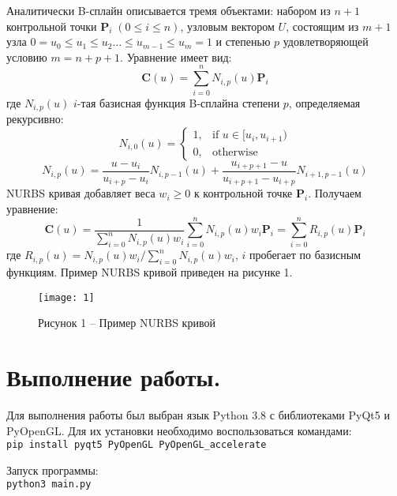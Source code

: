 Аналитически B-сплайн описывается тремя объектами: набором из $n+1$ контрольной точки
\(\mathbf{P}_{i}  \; (0\leq i \leq n)\), узловым вектором $U$, состоящим из $m + 1$ узла  \(0 = u_0 \leq
u_1 \leq u_2 \dots \leq u_{m-1} \leq u_m = 1\) и степенью $p$ удовлетворяющей условию \(m=n+p+1\).
Уравнение имеет вид:
\begin{displaymath}
    \mathbf{C} (u) = \sum_{i=0}^{n} N_{i,p}(u)\mathbf{P}_i
\end{displaymath}
где \(N_{i,p}(u)\) $i$-тая базисная функция B-сплайна степени $p$, определяемая рекурсивно:
\begin{displaymath}
    N_{i,0}(u) = \begin{cases}
                     1, & \mbox{if } u \in [u_i,u_{i+1})\\
                     0, & \mbox{otherwise}
    \end{cases}
\end{displaymath}
\begin{displaymath}
    N_{i,p}(u) = \frac{u-u_i}{u_{i+p}-u_i}N_{i,p-1}(u)+\frac{u_{i+p+1}-u}{u_{i+p+1}-u_{i+p}}N_{i+1,p-1}(u)
\end{displaymath}
NURBS кривая добавляет веса \(w_i \geq 0\) к контрольной точке \(\mathbf{P}_{i}\).
Получаем уравнение:
\begin{displaymath}
    \mathbf{C} (u) = \frac{1}{\sum_{i=0}^{n}N_{i,p}(u) w_i}\sum_{i=0}^{n} N_{i,p}(u) w_i \mathbf{P}_i
    = \sum_{i=0}^{n}R_{i,p}(u)\mathbf{P}_{i}
\end{displaymath}
где \(R_{i,p}(u) = N_{i,p}(u) w_i/\sum_{i=0}^{n}N_{i,p}(u) w_i\), $i$ пробегает по базисным функциям.
Пример NURBS кривой приведен на рисунке 1.
\begin{figure}[H]
    \centering
    \texttt{[image: 1]}
    \caption*{Рисунок 1 -- Пример NURBS кривой}
    \label{fig:1}
\end{figure}

\section*{Выполнение работы.}
Для выполнения работы был выбран язык Python 3.8 с библиотеками PyQt5 и PyOpenGL.
Для их установки необходимо воспользоваться командами:\\
\texttt{pip install pyqt5 PyOpenGL PyOpenGL\_accelerate}

Запуск программы:\\
\texttt{python3 main.py}

